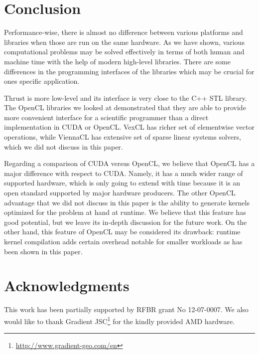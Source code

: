 \documentclass[1p]{elsarticle}
\begin{document}
% 
%
\section{Conclusion}

Performance-wise, there is almost no difference between various platforms and
libraries when those are run on the same hardware. As we have shown, various
computational problems may be solved effectively in terms of both human and
machine time with the help of modern high-level libraries.  There are some
differences in the programming interfaces of the libraries which may be crucial
for ones specific application. 

Thrust is more low-level and its interface is very close to the C++ STL
library.  The OpenCL libraries we looked at demonstrated that they are able to
provide more convenient interface for a scientific programmer than a direct
implementation in CUDA or OpenCL.  VexCL has richer set of elementwise vector
operations, while ViennaCL has extensive set of sparse linear systems solvers,
which we did not discuss in this paper.

Regarding a comparison of CUDA versus OpenCL, we believe that OpenCL has a
major difference with respect to CUDA. Namely, it has a  much wider range of
supported hardware, which is only going to extend with time because it is an
open standard supported by major hardware producers. The other OpenCL advantage
that we did not discuss in this paper is the ability to generate kernels
optimized for the problem at hand at runtime. We believe that this feature has
good potential, but we leave its in-depth discussion for the future work.  On
the other hand, this feature of OpenCL may be considered its drawback: runtime
kernel compilation adds certain overhead notable for smaller workloads as has
been shown in this paper. 





\section{Acknowledgments}

This work has been partially supported by RFBR grant No 12-07-0007. We also
would like to thank Gradient
JSC\footnote{\href{http://www.gradient-geo.com/en}{http://www.gradient-geo.com/en}}
for the kindly provided AMD hardware.




\end{document}
